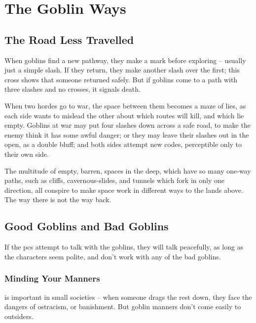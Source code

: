 
\section{The Goblin Ways}

\begin{multicols}{2}

\subsection{The Road Less Travelled}

When goblins find a new pathway, they make a mark before exploring -- usually just a simple slash.
If they return, they make another slash over the first; this cross shows that someone returned safely.
But if goblins come to a path with three slashes and no crosses, it signals death.

When two hordes go to war, the space between them becomes a maze of lies, as each side wants to mislead the other about which routes will kill, and which lie empty.
Goblins at war may put four slashes down across a safe road, to make the enemy think it has some awful danger; or they may leave their slashes out in the open, as a double bluff; and both sides attempt new codes, perceptible only to their own side.

The multitude of empty, barren, spaces in the \gls{deep}, which have so many one-way paths, such as cliffs, cavernous-slides, and tunnels which fork in only one direction, all conspire to make space work in different ways to the lands above.
The way there is not the way back.

\subsection{Good Goblins and Bad Goblins}

If the \glspl{pc} attempt to talk with the goblins, they will talk peacefully, as long as the characters seem polite, and don't work with any of the bad goblins.

\subsubsection{Minding Your Manners}
is important in small societies -- when someone drags the rest down, they face the dangers of ostracism, or banishment.
But goblin manners don't come easily to outsiders.


\end{multicols}
